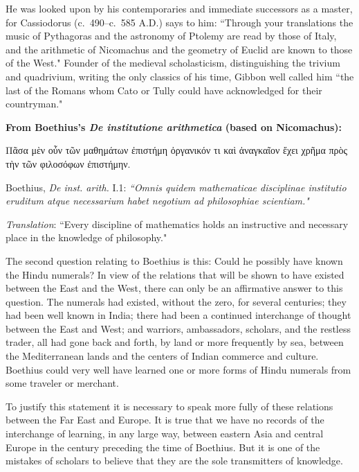\documentclass[11pt,a4paper]{article}
\newcommand{\gr}[1]{{\greekfont #1}}
\newenvironment{greekpassage}{%
  \begin{tcolorbox}[colback=greekbg,colframe=rulecolor,boxrule=0.5pt,
    left=8pt,right=8pt,top=6pt,bottom=6pt,fontupper=\greekfont]
}{\end{tcolorbox}}
\begin{document}
He was looked upon by his contemporaries and immediate successors as a master, for Cassiodorus (c.~490--c.~585 A.D.) says to him: ``Through your translations the music of Pythagoras and the astronomy of Ptolemy are read by those of Italy, and the arithmetic of Nicomachus and the geometry of Euclid are known to those of the West." Founder of the medieval scholasticism, distinguishing the trivium and quadrivium, writing the only classics of his time, Gibbon well called him ``the last of the Romans whom Cato or Tully could have acknowledged for their countryman."

\begin{greekpassage}
\textbf{From Boethius's \textit{De institutione arithmetica} (based on Nicomachus):}

\vspace{0.5em}
\gr{Πᾶσα μὲν οὖν τῶν μαθημάτων ἐπιστήμη ὀργανικόν τι καὶ ἀναγκαῖον ἔχει χρῆμα πρὸς τὴν τῶν φιλοσόφων ἐπιστήμην.}

\vspace{0.5em}
Boethius, \textit{De inst. arith.} I.1:
\textit{``Omnis quidem mathematicae disciplinae institutio eruditum atque necessarium habet negotium ad philosophiae scientiam."}

\vspace{0.3em}
\textit{Translation}: ``Every discipline of mathematics holds an instructive and necessary place in the knowledge of philosophy."
\end{greekpassage}

The second question relating to Boethius is this: Could he possibly have known the Hindu numerals? In view of the relations that will be shown to have existed between the East and the West, there can only be an affirmative answer to this question. The numerals had existed, without the zero, for several centuries; they had been well known in India; there had been a continued interchange of thought between the East and West; and warriors, ambassadors, scholars, and the restless trader, all had gone back and forth, by land or more frequently by sea, between the Mediterranean lands and the centers of Indian commerce and culture. Boethius could very well have learned one or more forms of Hindu numerals from some traveler or merchant.

To justify this statement it is necessary to speak more fully of these relations between the Far East and Europe. It is true that we have no records of the interchange of learning, in any large way, between eastern Asia and central Europe in the century preceding the time of Boethius. But it is one of the mistakes of scholars to believe that they are the sole transmitters of knowledge.
\end{document}
